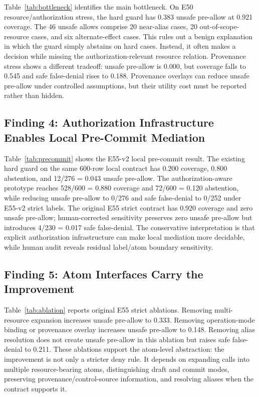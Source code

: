 

Table~\ref{tab:bottleneck} identifies the main bottleneck. On E50 resource/authorization stress, the hard guard has 0.383 unsafe pre-allow at 0.921 coverage. The 46 unsafe allows comprise 20 near-alias cases, 20 out-of-scope-resource cases, and six alternate-effect cases. This rules out a benign explanation in which the guard simply abstains on hard cases. Instead, it often makes a decision while missing the authorization-relevant resource relation. Provenance stress shows a different tradeoff: unsafe pre-allow is 0.000, but coverage falls to 0.545 and safe false-denial rises to 0.188. Provenance overlays can reduce unsafe pre-allow under controlled assumptions, but their utility cost must be reported rather than hidden.

\subsection{Finding 4: Authorization Infrastructure Enables Local Pre-Commit Mediation}



Table~\ref{tab:precommit} shows the E55-v2 local pre-commit result. The existing hard guard on the same 600-row local contract has 0.200 coverage, 0.800 abstention, and 12/276 = 0.043 unsafe pre-allow. The authorization-aware prototype reaches 528/600 = 0.880 coverage and 72/600 = 0.120 abstention, while reducing unsafe pre-allow to 0/276 and safe false-denial to 0/252 under E55-v2 strict labels. The original E55 strict contract has 0.920 coverage and zero unsafe pre-allow; human-corrected sensitivity preserves zero unsafe pre-allow but introduces 4/230 = 0.017 safe false-denial. The conservative interpretation is that explicit authorization infrastructure can make local mediation more decidable, while human audit reveals residual label/atom boundary sensitivity.

\subsection{Finding 5: Atom Interfaces Carry the Improvement}



Table~\ref{tab:ablation} reports original E55 strict ablations. Removing multi-resource expansion increases unsafe pre-allow to 0.333. Removing operation-mode binding or provenance overlay increases unsafe pre-allow to 0.148. Removing alias resolution does not create unsafe pre-allow in this ablation but raises safe false-denial to 0.211. These ablations support the atom-level abstraction: the improvement is not only a stricter deny rule. It depends on expanding calls into multiple resource-bearing atoms, distinguishing draft and commit modes, preserving provenance/control-source information, and resolving aliases when the contract supports it.

